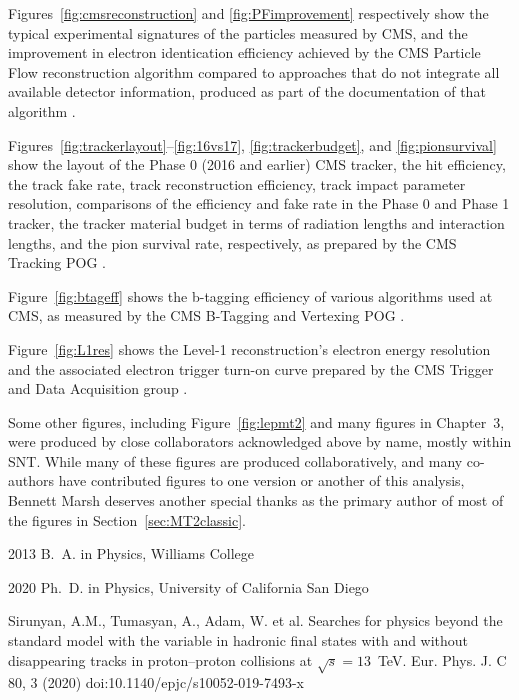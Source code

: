 \begin{frontmatter}
\begin{acknowledgements}
Figures~\ref{fig:cmsreconstruction} and \ref{fig:PFimprovement} respectively show the typical experimental signatures of the particles measured by CMS, and the improvement in electron identication efficiency achieved by the CMS Particle Flow reconstruction algorithm compared to approaches that do not integrate all available detector information, produced as part of the documentation of that algorithm \cite{particleflow}.

Figures~\ref{fig:trackerlayout}--\ref{fig:16vs17}, \ref{fig:trackerbudget}, and \ref{fig:pionsurvival} show the layout of the Phase 0 (2016 and earlier) CMS tracker, the hit efficiency, the track fake rate, track reconstruction efficiency, track impact parameter resolution, comparisons of the efficiency and fake rate in the Phase 0 and Phase 1 tracker, the tracker material budget in terms of radiation lengths and interaction lengths, and the pion survival rate, respectively, as prepared by the CMS Tracking POG \cite{cmstracking}.

Figure~\ref{fig:btageff} shows the b-tagging efficiency of various algorithms used at CMS, as measured by the CMS B-Tagging and Vertexing POG \cite{btagging}.

Figure~\ref{fig:L1res} shows the Level-1 reconstruction's electron energy resolution and the associated electron trigger turn-on curve prepared by the CMS Trigger and Data Acquisition group \cite{trigger}.

Some other figures, including Figure~\ref{fig:lepmt2} and many figures in Chapter~3, were produced by close collaborators acknowledged above by name, mostly within SNT.
While many of these figures are produced collaboratively, and many co-authors have contributed figures to one version or another of this analysis, Bennett Marsh deserves another special thanks as the primary author of most of the figures in Section~\ref{sec:MT2classic}.

\end{acknowledgements}


%
%
\begin{vitapage}
\begin{vita}
  \item[2013] B.~A. in Physics, Williams College
  \item[2020] Ph.~D. in Physics, University of California San Diego
\end{vita}
\begin{publications}
\item Sirunyan, A.M., Tumasyan, A., Adam, W. et al. Searches for physics beyond the standard model with the \mttwo variable in hadronic final states with and without disappearing tracks in proton–proton collisions at $\sqrt{s}=13$~TeV. Eur. Phys. J. C 80, 3 (2020) doi:10.1140/epjc/s10052-019-7493-x
\end{publications}
\end{vitapage}



\end{frontmatter}
